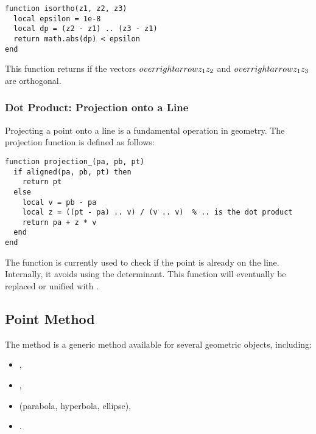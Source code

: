 \begin{verbatim}
function isortho(z1, z2, z3)
  local epsilon = 1e-8
  local dp = (z2 - z1) .. (z3 - z1)
  return math.abs(dp) < epsilon
end
\end{verbatim}

This function returns  if the vectors \( \\overrightarrow{z_1z_2} \) and \( \\overrightarrow{z_1z_3} \) are orthogonal.


\subsubsection{Dot Product: Projection onto a Line} %
\label{ssub:scalar_product_projection}

Projecting a point onto a line is a fundamental operation in geometry. The projection function is defined as follows:

\begin{verbatim}
function projection_(pa, pb, pt)
  if aligned(pa, pb, pt) then
    return pt
  else
    local v = pb - pa
    local z = ((pt - pa) .. v) / (v .. v)  % .. is the dot product
    return pa + z * v
  end
end
\end{verbatim}

The function  is currently used to check if the point is already on the line. Internally, it avoids using the determinant. This function will eventually be replaced or unified with .


\subsection{Point Method} %
\label{sub:point_method}

The  method is a generic method available for several geometric objects, including:

\begin{itemize}
  \item {},
  \item {},
  \item {} (parabola, hyperbola, ellipse),
  \item {}.
\end{itemize}

